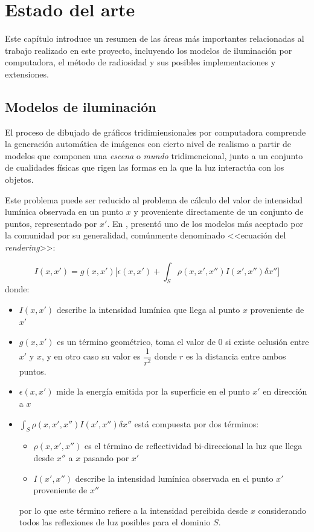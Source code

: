 \chapter{Estado del arte}
\label{ch:chap02}

Este capítulo introduce un resumen de las áreas más importantes relacionadas al trabajo realizado en este proyecto, incluyendo los modelos de iluminación por computadora, el método de radiosidad y sus posibles implementaciones y extensiones.

\section{Modelos de iluminación}
\label{sec:dibujado}

El proceso de dibujado de gráficos tridimiensionales por computadora comprende la generación automática de imágenes con cierto nivel de realismo a partir de modelos que componen una \textit{escena} o \textit{mundo} tridimencional, junto a un conjunto de cualidades físicas que rigen las formas en la que la luz interactúa con los objetos.

Este problema puede ser reducido al problema de cálculo del valor de intensidad lumínica observada en un punto $x$ y proveniente directamente de un conjunto de puntos, representado por $x'$. En  \citeyear{Kajiya}, \citeauthor{Kajiya} presentó uno de los modelos más aceptado por la comunidad por su generalidad, comúnmente denominado <<ecuación del \textit{rendering}>>:

\begin{equation}
    I(x,x') = g(x,x') \bigg[\epsilon(x,x') + \int_{S} \rho(x,x',x'')I(x',x'') \delta x''\bigg] \label{eq:rendering}
\end{equation}
donde:
\begin{itemize}
    \item $I(x,x')$ describe la intensidad lumínica que llega al punto $x$ proveniente de $x'$
    \item $g(x,x')$ es un término geométrico, toma el valor de $0$ si existe oclusión entre $x'$ y $x$, y en otro caso su valor es $\dfrac{1}{r^{2}}$ donde $r$ es la distancia entre ambos puntos.
    \item $\epsilon(x,x')$ mide la energía emitida por la superficie en el punto $x'$ en dirección a $x$
    \item $\int_{S} \rho(x,x',x'')I(x',x'') \delta x''$ está compuesta por dos términos:
        \begin{itemize}
            \item $\rho(x,x',x'')$ es el término de reflectividad bi-direccional la luz que llega desde $x''$ a $x$ pasando por $x'$
            \item $I(x',x'')$ describe la intensidad lumínica observada en el punto $x'$ proveniente de $x''$
        \end{itemize}
    por lo que este término refiere a la intensidad percibida desde $x$ considerando todos las reflexiones de
    luz posibles para el dominio $S$.
\end{itemize}

